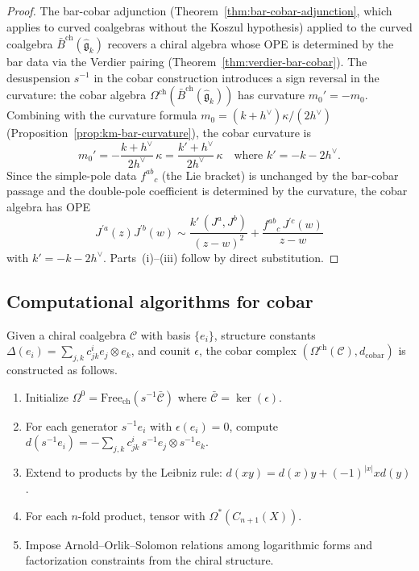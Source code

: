 \begin{proof}
The bar-cobar adjunction (Theorem~\ref{thm:bar-cobar-adjunction}, which applies to curved coalgebras without the Koszul hypothesis) applied to the curved coalgebra $\bar{B}^{\mathrm{ch}}(\widehat{\mathfrak{g}}_k)$ recovers a chiral algebra whose OPE is determined by the bar data via the Verdier pairing (Theorem~\ref{thm:verdier-bar-cobar}).  The desuspension $s^{-1}$ in the cobar construction introduces a sign reversal in the curvature: the cobar algebra $\Omega^{\mathrm{ch}}(\bar{B}^{\mathrm{ch}}(\widehat{\mathfrak{g}}_k))$ has curvature $m_0' = -m_0$.  Combining with the curvature formula $m_0 = (k+h^\vee)\kappa/(2h^\vee)$ (Proposition~\ref{prop:km-bar-curvature}), the cobar curvature is
\[
m_0' = -\frac{k + h^\vee}{2h^\vee}\,\kappa = \frac{k' + h^\vee}{2h^\vee}\,\kappa
\quad\text{where } k' = -k - 2h^\vee.
\]
Since the simple-pole data $f^{ab}{}_c$ (the Lie bracket) is unchanged by the bar-cobar passage and the double-pole coefficient is determined by the curvature, the cobar algebra has OPE
\[
J^{\prime a}(z) J^{\prime b}(w) \sim \frac{k'\,(J^a, J^b)}{(z-w)^2} + \frac{f^{ab}{}_c\, J^{\prime c}(w)}{z-w}
\]
with $k' = -k - 2h^\vee$.  Parts~(i)--(iii) follow by direct substitution.
\end{proof}

\subsection{Computational algorithms for cobar}

\begin{remark}
Given a chiral coalgebra $\mathcal{C}$ with basis $\{e_i\}$, structure constants $\Delta(e_i) = \sum_{j,k} c_{jk}^i e_j \otimes e_k$, and counit $\epsilon$, the cobar complex $(\Omega^{\mathrm{ch}}(\mathcal{C}), d_{\mathrm{cobar}})$ is constructed as follows.
\begin{enumerate}
\item Initialize $\Omega^0 = \mathrm{Free}_{\mathrm{ch}}(s^{-1}\bar{\mathcal{C}})$ where $\bar{\mathcal{C}} = \ker(\epsilon)$.
\item For each generator $s^{-1}e_i$ with $\epsilon(e_i) = 0$, compute $d(s^{-1}e_i) = -\sum_{j,k} c_{jk}^i \, s^{-1}e_j \otimes s^{-1}e_k$.
\item Extend to products by the Leibniz rule: $d(xy) = d(x)y + (-1)^{|x|}xd(y)$.
\item For each $n$-fold product, tensor with $\Omega^*(C_{n+1}(X))$.
\item Impose Arnold--Orlik--Solomon relations among logarithmic forms and factorization constraints from the chiral structure.
\end{enumerate}
\end{remark}

